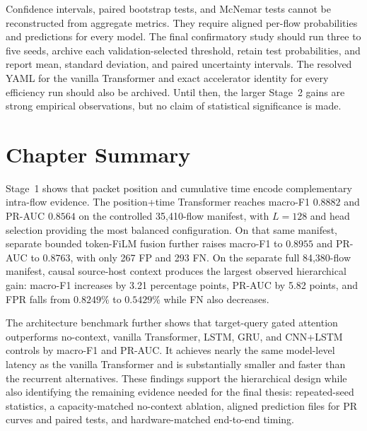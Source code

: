 Confidence intervals, paired bootstrap tests, and McNemar tests cannot be
reconstructed from aggregate metrics. They require aligned per-flow
probabilities and predictions for every model. The final confirmatory study
should run three to five seeds, archive each validation-selected threshold,
retain test probabilities, and report mean, standard deviation, and paired
uncertainty intervals. The resolved YAML for the vanilla Transformer and exact
accelerator identity for every efficiency run should also be archived. Until
then, the larger Stage~2 gains are strong empirical observations, but no claim
of statistical significance is made.

\section{Chapter Summary}
\label{subsec:results_summary}

Stage~1 shows that packet position and cumulative time encode complementary
intra-flow evidence. The position+time Transformer reaches macro-F1 $0.8882$
and PR-AUC $0.8564$ on the controlled 35,410-flow manifest, with $L=128$ and
head selection providing the most balanced configuration. On that same
manifest, separate bounded token-FiLM fusion further raises macro-F1 to
$0.8955$ and PR-AUC to $0.8763$, with only 267 FP and 293 FN. On the separate
full 84,380-flow manifest, causal source-host context produces the largest
observed hierarchical gain: macro-F1 increases by 3.21 percentage points,
PR-AUC by 5.82 points, and FPR falls from $0.8249\%$ to $0.5429\%$ while FN
also decreases.

The architecture benchmark further shows that target-query gated attention
outperforms no-context, vanilla Transformer, LSTM, GRU, and CNN+LSTM controls
by macro-F1 and PR-AUC. It achieves nearly the same model-level latency as the
vanilla Transformer and is substantially smaller and faster than the recurrent
alternatives. These findings support the hierarchical design while also
identifying the remaining evidence needed for the final thesis: repeated-seed
statistics, a capacity-matched no-context ablation, aligned prediction files
for PR curves and paired tests, and hardware-matched end-to-end timing.

